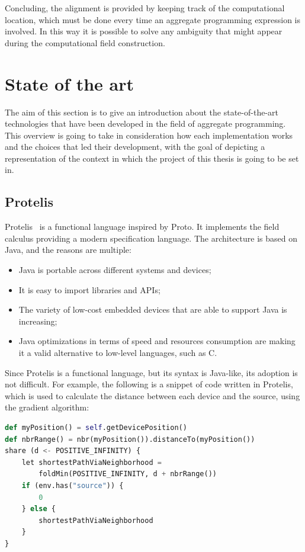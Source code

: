 Concluding, the alignment is provided by keeping track of the computational location, which must be done every time an aggregate programming expression is involved. In this way it is possible to solve any ambiguity that might appear during the computational field construction.

\section{State of the art}\label{section:state_of_the_art}
The aim of this section is to give an introduction about the state-of-the-art technologies that have been developed in the field of aggregate programming. This overview is going to take in consideration how each implementation works and the choices that led their development, with the goal of depicting a representation of the context in which the project of this thesis is going to be set in.

\subsection{Protelis}\label{subsection:protelis}
Protelis~\cite{protelis_introduction} is a functional language inspired by Proto. It implements the field calculus providing a modern specification language.\newline
The architecture is based on Java, and the reasons are multiple:
\begin{itemize}
    \item Java is portable across different systems and devices;
    \item It is easy to import libraries and APIs;
    \item The variety of low-cost embedded devices that are able to support Java is increasing;
    \item Java optimizations in terms of speed and resources consumption are making it a valid alternative to low-level languages, such as C.
\end{itemize}

Since Protelis is a functional language, but its syntax is Java-like, its adoption is not difficult. For example, the following is a snippet of code written in Protelis, which is used to calculate the distance between each device and the source, using the gradient algorithm:
\begin{lstlisting}[language=Python, caption=Protelis example, captionpos=b]
def myPosition() = self.getDevicePosition()
def nbrRange() = nbr(myPosition()).distanceTo(myPosition())
share (d <- POSITIVE_INFINITY) {
    let shortestPathViaNeighborhood = 
        foldMin(POSITIVE_INFINITY, d + nbrRange())
    if (env.has("source")) { 
        0 
    } else {
        shortestPathViaNeighborhood
    }
}
\end{lstlisting}


